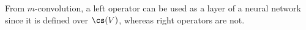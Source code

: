 



From $m$-convolution, a left operator can be used as a layer of a neural network since it is defined over $\cs(V)$, whereas right operators are not.

